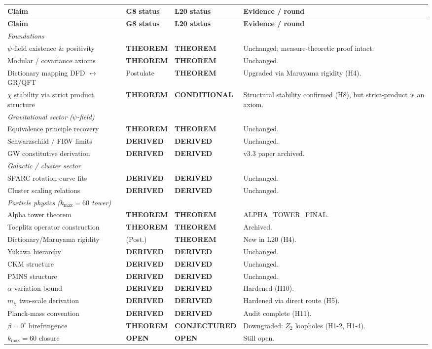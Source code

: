 \documentclass[11pt]{article}
\newcommand{\THM}{\textcolor{thmcol}{\textbf{THEOREM}}}
\newcommand{\DER}{\textcolor{dercol}{\textbf{DERIVED}}}
\newcommand{\CON}{\textcolor{condcol}{\textbf{CONDITIONAL}}}
\newcommand{\CNJ}{\textcolor{conjcol}{\textbf{CONJECTURED}}}
\newcommand{\OPN}{\textcolor{opencol}{\textbf{OPEN}}}
\begin{document}
\renewcommand{\arraystretch}{1.25}
\begin{longtable}{p{} p{} p{} p{}}
\toprule
\textbf{Claim} & \textbf{G8 status} & \textbf{L20 status} & \textbf{Evidence / round} \\
\midrule
\endfirsthead
\toprule
\textbf{Claim} & \textbf{G8 status} & \textbf{L20 status} & \textbf{Evidence / round} \\
\midrule
\endhead

\multicolumn{4}{l}{\textit{Foundations}} \\
\midrule
$\psi$-field existence \& positivity & \THM & \THM & Unchanged; measure-theoretic proof intact. \\
Modular / covariance axioms & \THM & \THM & Unchanged. \\
Dictionary mapping DFD $\leftrightarrow$ GR/QFT & Postulate & \THM & Upgraded via Maruyama rigidity (H4). \\
$\chi$ stability via strict product structure & \THM & \CON & Structural stability confirmed (H8), but strict-product is an axiom. \\
\midrule

\multicolumn{4}{l}{\textit{Gravitational sector ($\psi$-field)}} \\
\midrule
Equivalence principle recovery & \THM & \THM & Unchanged. \\
Schwarzschild / FRW limits & \DER & \DER & Unchanged. \\
GW constitutive derivation & \DER & \DER & v3.3 paper archived. \\
\midrule

\multicolumn{4}{l}{\textit{Galactic / cluster sector}} \\
\midrule
SPARC rotation-curve fits & \DER & \DER & Unchanged. \\
Cluster scaling relations & \DER & \DER & Unchanged. \\
\midrule

\multicolumn{4}{l}{\textit{Particle physics ($k_{\max}=60$ tower)}} \\
\midrule
Alpha tower theorem & \THM & \THM & ALPHA\_TOWER\_FINAL. \\
Toeplitz operator construction & \THM & \THM & Archived. \\
Dictionary/Maruyama rigidity & (Post.) & \THM & New in L20 (H4). \\
Yukawa hierarchy & \DER & \DER & Unchanged. \\
CKM structure & \DER & \DER & Unchanged. \\
PMNS structure & \DER & \DER & Unchanged. \\
$\alpha$ variation bound & \DER & \DER & Hardened (H10). \\
$m_\chi$ two-scale derivation & \DER & \DER & Hardened via direct route (H5). \\
Planck-mass convention & \DER & \DER & Audit complete (H11). \\
$\beta=0^\circ$ birefringence & \THM & \CNJ & Downgraded: $Z_2$ loopholes (H1-2, H1-4). \\
$k_{\max}=60$ closure & \OPN & \OPN & Still open. \\
\midrule


\end{longtable}
\end{document}
